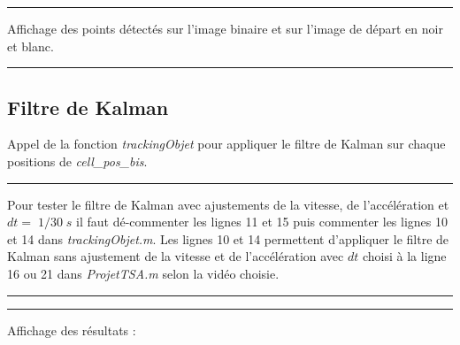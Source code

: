 \lstset{caption=ProjetTSA.m}


\hrule
\phantom{}
\phantom{}

	Affichage des points détectés sur l'image binaire et sur l'image de départ en noir et blanc.

\lstset{caption=ProjetTSA.m}


\hrule

\subsection{Filtre de Kalman}

	Appel de la fonction \emph{trackingObjet} pour appliquer le filtre de Kalman sur chaque positions de \emph{cell\_pos\_bis}.

\lstset{caption=ProjetTSA.m}


\hrule
\phantom{}
\phantom{}

	Pour tester le filtre de Kalman avec ajustements de la vitesse, de l'accélération et $ dt = \; 1/30 \; s $ il faut dé-commenter les lignes 11 et 15 puis commenter les lignes 10 et 14 dans \emph{trackingObjet.m}. Les lignes 10 et 14 permettent d'appliquer le filtre de Kalman sans ajustement de la vitesse et de l'accélération avec $ dt $ choisi à la ligne 16 ou 21 dans \emph{ProjetTSA.m} selon la vidéo choisie.
\lstset{caption=trackingObjet.m}


\hrule
\phantom{}
\phantom{}

\lstset{caption=kalmanFilter.m}


\hrule
\phantom{}
\phantom{}

	Affichage des résultats :
	
\lstset{caption=ProjetTSA.m}



